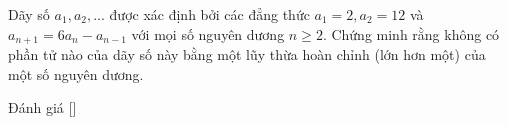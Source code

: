 \ifshowproblem
\begin{problem}\label{problem:BGR-2015-MO-P1}
    Dãy số $a_1, a_2,...$ được xác định bởi các đẳng thức $a_1 = 2, a_2 = 12$ và $a_{n+1} = 6a_n-a_{n-1}$ với mọi số nguyên dương $n \ge 2$.
    Chứng minh rằng không có phần tử nào của dãy số này bằng một lũy thừa hoàn chỉnh (lớn hơn một) của một số nguyên dương.
\end{problem}
\fi

\ifshowinfo
Đánh giá [\textbf{}]\footnotemark
{}
\fi